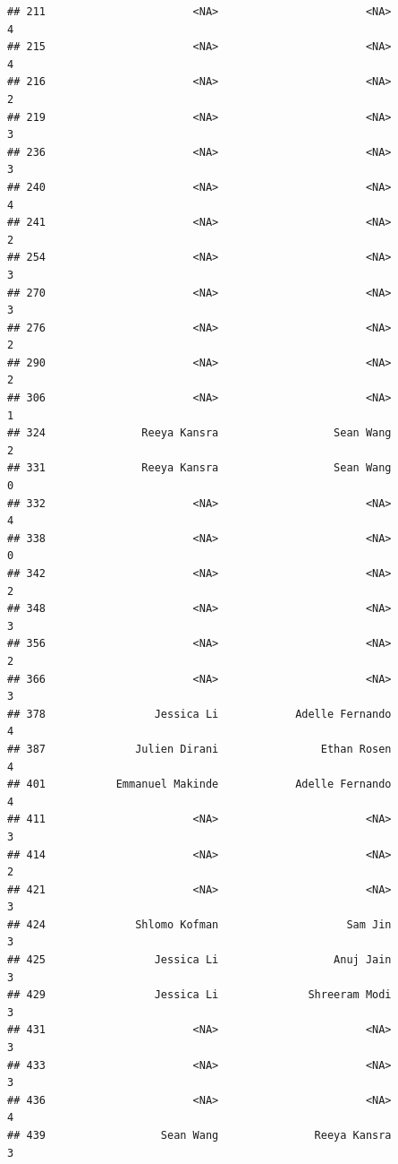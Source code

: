 \documentclass[
]{article}
\begin{document}
\begin{verbatim}
## 211                       <NA>                       <NA>                  4
## 215                       <NA>                       <NA>                  4
## 216                       <NA>                       <NA>                  2
## 219                       <NA>                       <NA>                  3
## 236                       <NA>                       <NA>                  3
## 240                       <NA>                       <NA>                  4
## 241                       <NA>                       <NA>                  2
## 254                       <NA>                       <NA>                  3
## 270                       <NA>                       <NA>                  3
## 276                       <NA>                       <NA>                  2
## 290                       <NA>                       <NA>                  2
## 306                       <NA>                       <NA>                  1
## 324               Reeya Kansra                  Sean Wang                  2
## 331               Reeya Kansra                  Sean Wang                  0
## 332                       <NA>                       <NA>                  4
## 338                       <NA>                       <NA>                  0
## 342                       <NA>                       <NA>                  2
## 348                       <NA>                       <NA>                  3
## 356                       <NA>                       <NA>                  2
## 366                       <NA>                       <NA>                  3
## 378                 Jessica Li            Adelle Fernando                  4
## 387              Julien Dirani                Ethan Rosen                  4
## 401           Emmanuel Makinde            Adelle Fernando                  4
## 411                       <NA>                       <NA>                  3
## 414                       <NA>                       <NA>                  2
## 421                       <NA>                       <NA>                  3
## 424              Shlomo Kofman                    Sam Jin                  3
## 425                 Jessica Li                  Anuj Jain                  3
## 429                 Jessica Li              Shreeram Modi                  3
## 431                       <NA>                       <NA>                  3
## 433                       <NA>                       <NA>                  3
## 436                       <NA>                       <NA>                  4
## 439                  Sean Wang               Reeya Kansra                  3

\end{verbatim}
\end{document}
